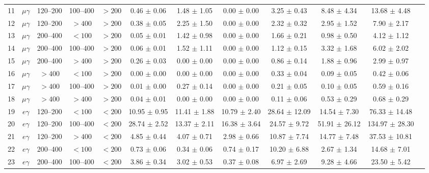 \begin{table}[htbp]
{\begin{tabular}{|c|c|c|c|c|c|c|c|c|c|c|c|}
11 & $\mu\gamma$ & 120--200 & 100--400 & $>200$ & 0.46 $\pm$ 0.06 & 1.48 $\pm$ 1.05 & 0.00 $\pm$ 0.00 & 3.25 $\pm$ 0.43 & 8.48 $\pm$ 4.34 & 13.68 $\pm$ 4.48 &  \\
12 & $\mu\gamma$ & 120--200 & $>400$ & $>200$ & 0.38 $\pm$ 0.05 & 2.25 $\pm$ 1.50 & 0.00 $\pm$ 0.00 & 2.32 $\pm$ 0.32 & 2.95 $\pm$ 1.52 & 7.90 $\pm$ 2.17 &  \\
13 & $\mu\gamma$ & 200--400 & $<100$ & $>200$ & 0.05 $\pm$ 0.01 & 1.42 $\pm$ 0.98 & 0.00 $\pm$ 0.00 & 1.66 $\pm$ 0.21 & 0.98 $\pm$ 0.50 & 4.12 $\pm$ 1.12 &  \\
14 & $\mu\gamma$ & 200--400 & 100--400 & $>200$ & 0.06 $\pm$ 0.01 & 1.52 $\pm$ 1.11 & 0.00 $\pm$ 0.00 & 1.12 $\pm$ 0.15 & 3.32 $\pm$ 1.68 & 6.02 $\pm$ 2.02 &  \\
15 & $\mu\gamma$ & 200--400 & $>400$ & $>200$ & 0.26 $\pm$ 0.03 & 0.00 $\pm$ 0.00 & 0.00 $\pm$ 0.00 & 0.86 $\pm$ 0.14 & 1.88 $\pm$ 0.96 & 2.99 $\pm$ 0.97 &  \\
16 & $\mu\gamma$ & $>400$ & $<100$ & $>200$ & 0.00 $\pm$ 0.00 & 0.00 $\pm$ 0.00 & 0.00 $\pm$ 0.00 & 0.33 $\pm$ 0.04 & 0.09 $\pm$ 0.05 & 0.42 $\pm$ 0.06 &  \\
17 & $\mu\gamma$ & $>400$ & 100--400 & $>200$ & 0.01 $\pm$ 0.00 & 0.27 $\pm$ 0.14 & 0.00 $\pm$ 0.00 & 0.21 $\pm$ 0.05 & 0.10 $\pm$ 0.05 & 0.59 $\pm$ 0.16 &  \\
18 & $\mu\gamma$ & $>400$ & $>400$ & $>200$ & 0.04 $\pm$ 0.01 & 0.00 $\pm$ 0.00 & 0.00 $\pm$ 0.00 & 0.11 $\pm$ 0.06 & 0.53 $\pm$ 0.29 & 0.68 $\pm$ 0.29 &  \\
\hline
19 & $e\gamma$ & 120--200 & $<100$ & $<200$ & 10.95 $\pm$ 0.95 & 11.41 $\pm$ 1.88 & 10.79 $\pm$ 2.40 & 28.64 $\pm$ 12.09 & 14.54 $\pm$ 7.30 & 76.33 $\pm$ 14.48 &  \\
20 & $e\gamma$ & 120--200 & 100--400 & $<200$ & 28.74 $\pm$ 2.52 & 13.37 $\pm$ 2.11 & 16.38 $\pm$ 3.64 & 24.57 $\pm$ 9.72 & 51.91 $\pm$ 26.12 & 134.97 $\pm$ 28.30 &  \\
21 & $e\gamma$ & 120--200 & $>400$ & $<200$ & 4.85 $\pm$ 0.44 & 4.07 $\pm$ 0.71 & 2.98 $\pm$ 0.66 & 10.87 $\pm$ 7.74 & 14.77 $\pm$ 7.48 & 37.53 $\pm$ 10.81 &  \\
22 & $e\gamma$ & 200--400 & $<100$ & $<200$ & 0.73 $\pm$ 0.06 & 0.34 $\pm$ 0.06 & 0.74 $\pm$ 0.17 & 10.20 $\pm$ 6.88 & 2.67 $\pm$ 1.34 & 14.68 $\pm$ 7.01 &  \\
23 & $e\gamma$ & 200--400 & 100--400 & $<200$ & 3.86 $\pm$ 0.34 & 3.02 $\pm$ 0.53 & 0.37 $\pm$ 0.08 & 6.97 $\pm$ 2.69 & 9.28 $\pm$ 4.66 & 23.50 $\pm$ 5.42 &  \\

\end{tabular}}
\end{table}
